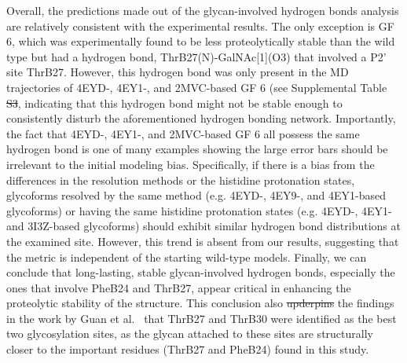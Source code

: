 \documentclass[9pt]{elife}
\providecommand{\DIFaddtex}[1]{{\protect\color{blue}\uwave{#1}}} %
\providecommand{\DIFdeltex}[1]{{\protect\color{red}\sout{#1}}}                      %
\providecommand{\DIFaddbegin}{} %
\providecommand{\DIFaddend}{} %
\providecommand{\DIFdelbegin}{} %
\providecommand{\DIFdelend}{} %
\providecommand{\DIFadd}[1]{\texorpdfstring{\DIFaddtex{#1}}{#1}} %
\providecommand{\DIFdel}[1]{\texorpdfstring{\DIFdeltex{#1}}{}} %
\begin{document}
Overall, the predictions made out of the glycan-involved hydrogen bonds analysis are relatively consistent with the experimental results. The only exception is GF 6, which was experimentally found to be less proteolytically stable than the wild type but had a hydrogen bond, ThrB27(N)-GalNAc[1](O3) that involved a P2' site ThrB27. However, this hydrogen bond was only present in the MD trajectories of 4EYD-, 4EY1-, and 2MVC-based GF 6 (see Supplemental Table \DIFdelbegin \DIFdel{S3}\DIFdelend \DIFaddbegin \DIFadd{S5)}\DIFaddend , indicating that this hydrogen bond might not be stable enough to consistently disturb the aforementioned hydrogen bonding network. Importantly, the fact that 4EYD-, 4EY1-, and 2MVC-based GF 6 all possess the same hydrogen bond is one of many examples showing the large error bars should be irrelevant to the initial modeling bias. Specifically, if there is a bias from the differences in the resolution methods or the histidine protonation states, glycoforms resolved by the same method (e.g. 4EYD-, 4EY9-, and 4EY1-based glycoforms) or having the same histidine protonation states (e.g. 4EYD-, 4EY1- and 3I3Z-based glycoforms) should exhibit similar hydrogen bond distributions at the examined site. However, this trend is absent from our results, suggesting that the metric is independent of the starting wild-type models. Finally, we can conclude that long-lasting, stable glycan-involved hydrogen bonds, especially the ones that involve PheB24 and ThrB27, appear critical in enhancing the proteolytic stability of the structure. This conclusion also \DIFdelbegin \DIFdel{upderpins }\DIFdelend \DIFaddbegin \DIFadd{underpins }\DIFaddend the findings in the work by Guan et al.~\cite{guan2018chemically} that ThrB27 and ThrB30 were identified as the best two glycosylation sites, as the glycan attached to these sites are structurally closer to the important residues (ThrB27 and PheB24) found in this study. 
\end{document}
